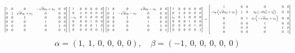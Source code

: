 \documentclass[11pt]{article}
\theoremstyle{definition}
\begin{document}
\[
\scaletoalign{\textwidth}{{\left[\begin{matrix}1 & 0 & 0 & - \sqrt{d} u_{0} + u_{1} & 0 & 0\\0 & 1 & \sqrt{d} u_{0} + u_{1} & 0 & 0 & 0\\0 & 0 & 1 & 0 & 0 & 0\\0 & 0 & 0 & 1 & 0 & 0\\0 & 0 & 0 & 0 & 1 & 0\\0 & 0 & 0 & 0 & 0 & 1\end{matrix}\right]} {\left[\begin{matrix}1 & 0 & 0 & 0 & 0 & 0\\0 & 1 & 0 & 0 & 0 & 0\\- v_{0} & 0 & 1 & 0 & 0 & 0\\0 & 0 & 0 & 1 & 0 & 0\\0 & 0 & 0 & 0 & 1 & 0\\0 & 0 & 0 & 0 & 0 & 1\end{matrix}\right]} {\left[\begin{matrix}1 & 0 & 0 & \sqrt{d} u_{0} - u_{1} & 0 & 0\\0 & 1 & - \sqrt{d} u_{0} - u_{1} & 0 & 0 & 0\\0 & 0 & 1 & 0 & 0 & 0\\0 & 0 & 0 & 1 & 0 & 0\\0 & 0 & 0 & 0 & 1 & 0\\0 & 0 & 0 & 0 & 0 & 1\end{matrix}\right]} {\left[\begin{matrix}1 & 0 & 0 & 0 & 0 & 0\\0 & 1 & 0 & 0 & 0 & 0\\v_{0} & 0 & 1 & 0 & 0 & 0\\0 & 0 & 0 & 1 & 0 & 0\\0 & 0 & 0 & 0 & 1 & 0\\0 & 0 & 0 & 0 & 0 & 1\end{matrix}\right]} = {\left[\begin{matrix}1 & 0 & 0 & 0 & 0 & 0\\- v_{0} \left(\sqrt{d} u_{0} + u_{1}\right) & 1 & 0 & v_{0} \left(- d u_{0}^{2} + u_{1}^{2}\right) & 0 & 0\\0 & 0 & 1 & v_{0} \left(- \sqrt{d} u_{0} + u_{1}\right) & 0 & 0\\0 & 0 & 0 & 1 & 0 & 0\\0 & 0 & 0 & 0 & 1 & 0\\0 & 0 & 0 & 0 & 0 & 1\end{matrix}\right]}}
\]
\[
\alpha = \left( 1, \  1, \  0, \  0, \  0, \  0\right), \quad \beta = \left( -1, \  0, \  0, \  0, \  0, \  0\right)
\]
\end{document}
